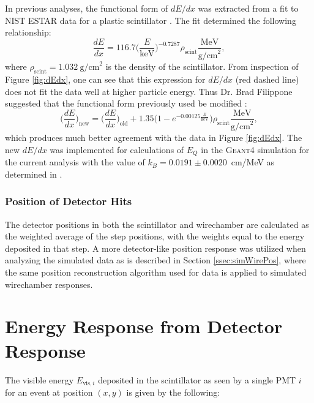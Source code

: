 In previous analyses, the functional form of $dE/dx $ was extracted from a fit to NIST ESTAR data
for a plastic scintillator \cite{yuan2006progress}. The fit determined the following relationship:
%
\begin{equation}
  \frac{dE}{dx} = 116.7\bigg(\frac{E}{\mathrm{keV}}\bigg)^{-0.7287} \rho_{\mathrm{scint}} \frac{\mathrm{MeV}}{\mathrm{g/cm}^2},
\end{equation}
%
where $\rho_{\mathrm{scint}}=1.032~\mathrm{g/cm}^2$ is the density of the scintillator. From
inspection of Figure \ref{fig:dEdx}, one can see that this expression for $dE/dx$ (red dashed line)
does not fit the data well at higher particle energy. Thus Dr. Brad Filippone suggested that the
functional form previously used be modified \cite{bradF_ELOG}:
%
\begin{equation}
  \bigg(\frac{dE}{dx}\bigg)_{\mathrm{new}} = \bigg(\frac{dE}{dx}\bigg)_{\mathrm{old}} + 1.35\big(1-e^{-0.00125\frac{E}{\mathrm{keV}}}\big) \rho_{\mathrm{scint}} \frac{\mathrm{MeV}}{\mathrm{g/cm}^2},
\end{equation}
%
which produces much better agreement with the data in Figure \ref{fig:dEdx}. The new $dE/dx$ was implemented for calculations
of $E_Q$ in the \textsc{Geant4} simulation for the current analysis with the value of $k_B=0.0191\pm0.0020$~cm/MeV as determined in
\cite{yuan2006progress}.




\subsubsection{Position of Detector Hits}
The detector positions in both the scintillator and wirechamber are calculated as the weighted
average of the step positions, with the weights equal to the energy deposited in that step.
A more detector-like position response was utilized when analyzing the simulated data as is described
in Section \ref{ssec:simWirePos}, where the same position reconstruction algorithm used for data
is applied to simulated wirechamber responses.



\section{Energy Response from Detector Response} \label{sec:EnergyResponse}

The visible energy $E_{\mathrm{vis},i}$ deposited
in the scintillator as seen by a single PMT $i$ for an event at position $(x,y)$ 
is given by the following: 

